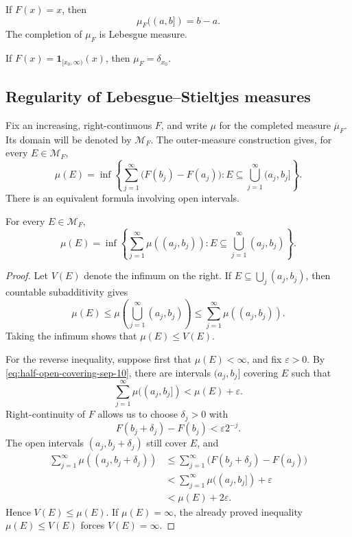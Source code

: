 \begin{example}
  If $F(x)=x$, then
  \[
    \mu_F((a,b])=b-a.
  \]
  The completion of $\mu_F$ is Lebesgue measure.
\end{example}

\begin{example}
  If $F(x)=\mathbf 1_{[x_0,\infty)}(x)$, then
  $\mu_F=\delta_{x_0}$.
\end{example}

\subsection{Regularity of Lebesgue--Stieltjes measures}

Fix an increasing, right-continuous $F$, and write $\mu$ for the
completed measure $\overline{\mu}_F$. Its domain will be denoted by
$\mathcal M_F$. The outer-measure construction gives, for every
$E\in\mathcal M_F$,
\begin{equation}\label{eq:half-open-covering-sep-10}
  \mu(E)=\inf\left\{
    \sum_{j=1}^{\infty}\bigl(F(b_j)-F(a_j)\bigr):
    E\subseteq\bigcup_{j=1}^{\infty}(a_j,b_j]
  \right\}.
\end{equation}
There is an equivalent formula involving open intervals.

\begin{lemma}
  \label{lem:open-covering-sep-10}
  For every $E\in\mathcal M_F$,
  \[
    \mu(E)=\inf\left\{
      \sum_{j=1}^{\infty}\mu((a_j,b_j)):
      E\subseteq\bigcup_{j=1}^{\infty}(a_j,b_j)
    \right\}.
  \]
\end{lemma}

\begin{proof}
  Let $V(E)$ denote the infimum on the right. If
  $E\subseteq\bigcup_j(a_j,b_j)$, then countable subadditivity gives
  \[
    \mu(E)
    \leq\mu\left(\bigcup_{j=1}^{\infty}(a_j,b_j)\right)
    \leq\sum_{j=1}^{\infty}\mu((a_j,b_j)).
  \]
  Taking the infimum shows that $\mu(E)\leq V(E)$.

  For the reverse inequality, suppose first that $\mu(E)<\infty$, and
  fix $\varepsilon>0$. By
  \eqref{eq:half-open-covering-sep-10}, there are intervals
  $(a_j,b_j]$ covering $E$ such that
  \[
    \sum_{j=1}^{\infty}\mu((a_j,b_j])
    <\mu(E)+\varepsilon.
  \]
  Right-continuity of $F$ allows us to choose $\delta_j>0$ with
  \[
    F(b_j+\delta_j)-F(b_j)<\varepsilon 2^{-j}.
  \]
  The open intervals $(a_j,b_j+\delta_j)$ still cover $E$, and
  \begin{align*}
    \sum_{j=1}^{\infty}\mu((a_j,b_j+\delta_j))
    &\leq\sum_{j=1}^{\infty}
      \bigl(F(b_j+\delta_j)-F(a_j)\bigr)\\
    &<\sum_{j=1}^{\infty}\mu((a_j,b_j])+\varepsilon\\
    &<\mu(E)+2\varepsilon.
  \end{align*}
  Hence $V(E)\leq\mu(E)$. If $\mu(E)=\infty$, the already proved
  inequality $\mu(E)\leq V(E)$ forces $V(E)=\infty$.
\end{proof}

